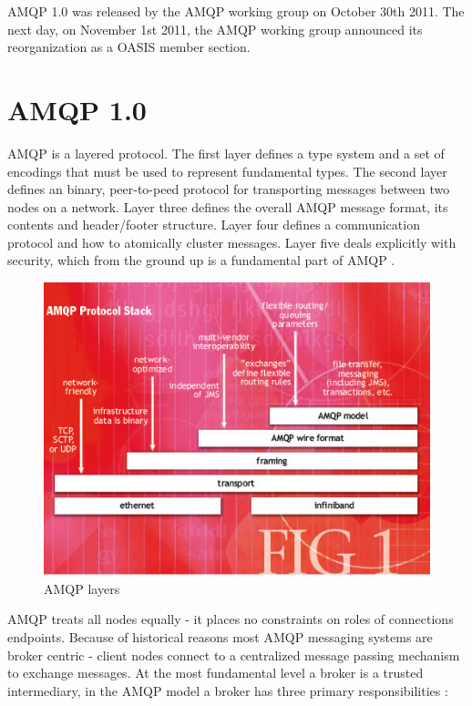 \documentclass{thesis}
\begin{document}
AMQP 1.0 was released by the AMQP working group on October 30th 2011.  The next day, on November 1st 2011, the AMQP working group announced its reorganization as a OASIS member section. \cite{AMQP}

\section{AMQP 1.0}

AMQP is a layered protocol.  The first layer defines a type system and a set of encodings that must be used to represent fundamental types.  The second layer defines an binary, peer-to-peed protocol for transporting messages between two nodes on a network.  Layer three defines the overall AMQP message format, its contents and header/footer structure.  Layer four defines a communication protocol and how to atomically cluster messages.  Layer five deals explicitly with security, which from the ground up is a fundamental part of AMQP \cite{AMQP1.0}. 

\begin{figure}[h]
\centering
\includegraphics[scale=.75]{ohara1.jpg}  
\caption{AMQP layers}
\end{figure}

AMQP treats all nodes equally - it places no constraints on roles of connections endpoints.   Because of historical reasons most AMQP messaging systems are broker centric - client nodes connect to a centralized message passing mechanism to exchange messages.  At the most fundamental level a broker is a trusted intermediary, in the AMQP model a broker has three primary responsibilities \cite{O'Hara}:
\end{document}
